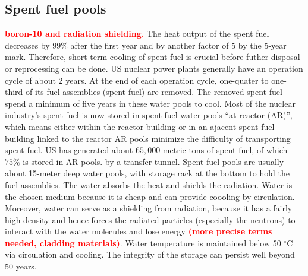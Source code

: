 \documentclass[preprint,aip,pra]{revtex4-1}
\newcommand{\red}[1]{\textcolor{red}{\bf #1}}
\begin{document}
    \subsection{Spent fuel pools}
    \red{boron-10 and radiation shielding.}
    The heat output of the spent fuel decreases by $99\%$ after the first year and by another factor of $5$
    by the 5-year mark.\cite{aa12} Therefore, short-term cooling of spent fuel is crucial before
    futher disposal or reprocessing can be done.
    US nuclear power plants generally have an operation cycle of about 2 years. At the end of each operation cycle,
    one-quater to one-third of its fuel assemblies (spent fuel) are removed. The removed spent fuel spend a minimum
    of five years in these water pools to cool.
    Most of the nuclear industry's spent fuel is now stored in spent fuel water pools ``at-reactor (AR)'',
    which means either within the reactor building or in an ajacent spent fuel building linked to the reactor
    AR pools minimize the difficulty of transporting spent fuel.\cite{iaea99}
    US has generated about $65,000$ metric tons of spent fuel, of which $75\%$ is stored in AR pools.\cite{a11}
    by a transfer tunnel. 
    Spent fuel pools  are usually about 15-meter deep water pools, with storage rack at the bottom to hold the fuel assemblies.
    The water absorbs the heat and shields the radiation. Water is the chosen medium because it is cheap and
    can provide coooling by circulation. Moreover, water can serve as a shielding from radiation, because it has a
    fairly high density and hence forces the radiated particles (especially the neutrons) to interact with
    the water molecules and lose energy \red{(more precise terms needed, cladding materials)}. Water temperature is maintained
    below 50 $^\circ$C via circulation and cooling. The integrity of the storage can persist well beyond 
    50 years.\cite{a11, iaea99}
\end{document}
